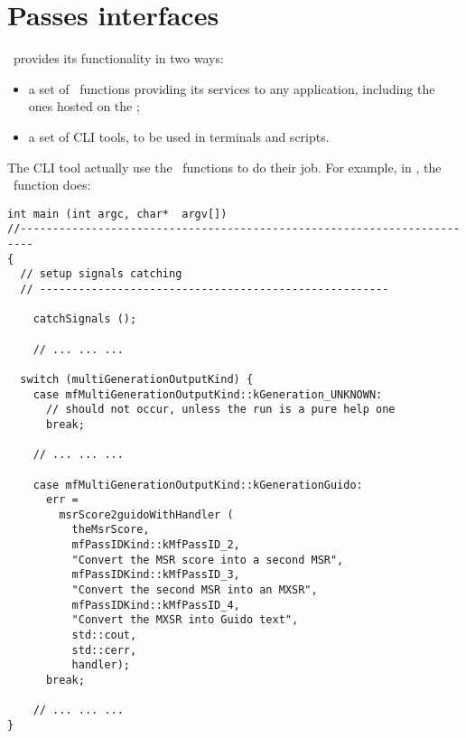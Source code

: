 



\chapter{Passes interfaces}

\mf\ provides its functionality in two ways:
\begin{itemize}
\item a set of \API\ functions providing its services to any application, including the ones hosted on the \Web;
\item a set of CLI tools, to be used in terminals and scripts.
\end{itemize}

The CLI tool actually use the \API\ functions to do their job. For example, in {\tt }, the \mainFunction\ function does:
\begin{lstlisting}[language=CPlusPlus]
int main (int argc, char*  argv[])
//------------------------------------------------------------------------
{
  // setup signals catching
  // ------------------------------------------------------

	catchSignals ();

	// ... ... ...

  switch (multiGenerationOutputKind) {
    case mfMultiGenerationOutputKind::kGeneration_UNKNOWN:
      // should not occur, unless the run is a pure help one
      break;

  	// ... ... ...

    case mfMultiGenerationOutputKind::kGenerationGuido:
      err =
        msrScore2guidoWithHandler (
          theMsrScore,
          mfPassIDKind::kMfPassID_2,
          "Convert the MSR score into a second MSR",
          mfPassIDKind::kMfPassID_3,
          "Convert the second MSR into an MXSR",
          mfPassIDKind::kMfPassID_4,
          "Convert the MXSR into Guido text",
          std::cout,
          std::cerr,
          handler);
      break;

	// ... ... ...
}
\end{lstlisting}


